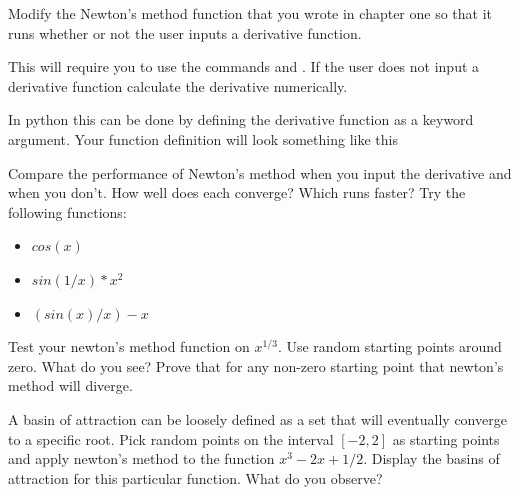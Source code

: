 \begin{problem}
Modify the Newton's method function that you wrote in chapter one so that it runs whether or not the user inputs a derivative function. \begin{matlab}This will require you to use the commands  and . If the user does not input a derivative function calculate the derivative numerically.\end{matlab}\begin{python}In python this can be done by defining the derivative function as a keyword argument.  Your function definition will look something like this \end{python}

Compare the performance of Newton's method when you input the derivative and when you don't. How well does each converge? Which runs faster? Try the following functions:

\begin{itemize}
\item $cos(x)$
\item $sin(1/x)*x^2$
\item $(sin(x)/x)-x$
\end{itemize}



\end{problem}

\begin{problem}
Test your newton's method function on $x^{1/3}$. Use random starting points around zero. What do you see? Prove that for any non-zero starting point that newton's method will diverge.
\end{problem}

\begin{problem}
A basin of attraction can be loosely defined as a set that will eventually converge to a specific root. Pick random points on the interval $[-2,2]$ as starting points and apply newton's method to the function $x^3 -2x + 1/2$. Display the basins of attraction for this particular function. What do you observe?


\end{problem}

